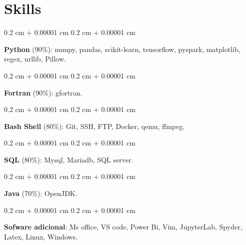 \documentclass[10pt, letterpaper]{article}
\newenvironment{onecolentry}{
    \begin{adjustwidth}{
        0.2 cm + 0.00001 cm
    }{
        0.2 cm + 0.00001 cm
    }
}{
    \end{adjustwidth}
} %
\begin{document}
    
    
    
    \section{Skills}



        

        \vspace{0.2 cm}

        \begin{onecolentry}
            \textbf{Python} (90\%):  numpy, pandas, scikit-learn, tensorflow, pyspark, matplotlib, regex, urllib, Pillow.
        \end{onecolentry}

        \vspace{0.1cm}
        
        \begin{onecolentry}
            \textbf{Fortran} (90\%):  gfortran.
        \end{onecolentry}
        \vspace{0.1cm}   
        
        \begin{onecolentry}
            \textbf{Bash Shell} (80\%): Git, SSH, FTP, Docker, qemu, ffmpeg.
        \end{onecolentry}
        
        \vspace{0.1cm}        
                  
        \begin{onecolentry}
            \textbf{SQL} (80\%): Mysql, Mariadb, SQL server.
        \end{onecolentry}
        
        \vspace{0.1cm} 
        
        \begin{onecolentry}
            \textbf{Java} (70\%): OpenJDK.
        \end{onecolentry}
        

        \vspace{0.1cm}
        
        \begin{onecolentry}
            \textbf{Sofware adicional}: Ms office, VS code, Power Bi, Vim, JupyterLab, Spyder, Latex, Linux, Windows. 
        \end{onecolentry}
        
        \vspace{0.1cm}
        
\end{document}
